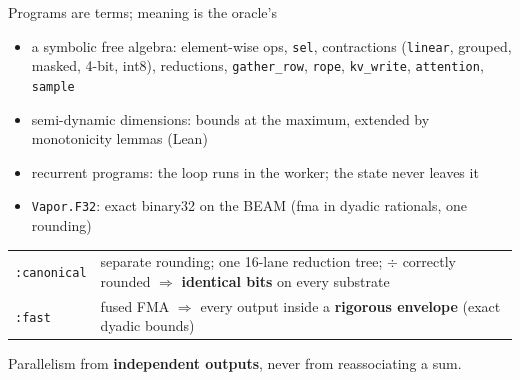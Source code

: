\documentclass[aspectratio=169,11pt]{beamer}
\begin{document}
\begin{frame}{Programs are terms; meaning is the oracle's}
\begin{itemize}
\item a symbolic free algebra: element-wise ops, \texttt{sel}, contractions (\texttt{linear}, grouped, masked, 4-bit, int8), reductions, \texttt{gather\_row}, \texttt{rope}, \texttt{kv\_write}, \texttt{attention}, \texttt{sample}
\item semi-dynamic dimensions: bounds at the maximum, extended by monotonicity lemmas (Lean)
\item recurrent programs: the loop runs in the worker; the state never leaves it
\item \texttt{Vapor.F32}: exact binary32 on the BEAM (fma in dyadic rationals, one rounding)
\end{itemize}
\vspace{0.6em}
\begin{tabularx}{\linewidth}{@{}lX@{}}
\toprule
\texttt{:canonical} & separate rounding; one 16-lane reduction tree; $\div$ correctly rounded $\Rightarrow$ \textbf{identical bits} on every substrate \\
\texttt{:fast} & fused FMA $\Rightarrow$ every output inside a \textbf{rigorous envelope} (exact dyadic bounds) \\
\bottomrule
\end{tabularx}

\vspace{0.6em}
Parallelism from \textbf{independent outputs}, never from reassociating a sum.
\end{frame}
\end{document}
